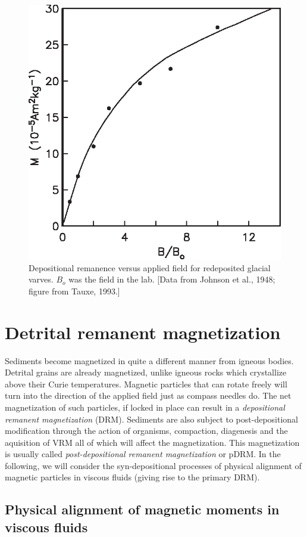 \begin{figure}[h!tb]
\centering  \includegraphics[width=6.5 cm]{EPSfiles/lit-redep.eps}
\caption{Depositional remanence versus applied field for redeposited glacial varves.  $B_o$ was the field in the lab.  [Data from Johnson et al., 1948; figure from Tauxe, 1993.]}
\label{fig:lit-redep}
\end{figure}
\nocite{johnson48,tauxe93}



\section {Detrital remanent magnetization}
\label{sect:drm}

Sediments become magnetized in quite a different
manner from igneous bodies.  Detrital grains are already magnetized, unlike
igneous rocks which crystallize above their 
Curie temperatures. Magnetic  particles that can rotate freely will turn into the direction of the applied field just as compass needles do.  The net magnetization of such particles, if locked in place can result in a 
{\it depositional remanent magnetization} (DRM).    Sediments are also subject to post-depositional modification through the action of organisms, compaction,  diagenesis  and the aquisition of VRM all of which will affect the magnetization.  This magnetization is usually called 
{\it post-depositional remanent magnetization} or pDRM.    In the following, we will consider the syn-depositional processes of physical alignment of magnetic particles in viscous fluids (giving rise to the primary DRM).


\subsection{Physical alignment of magnetic moments in viscous fluids}


